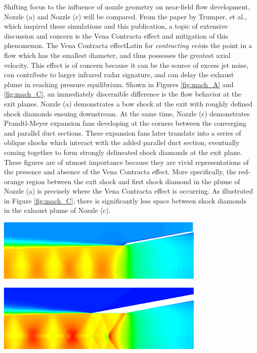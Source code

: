 \documentclass[12pt]{article} %
\begin{document}
Shifting focus to the influence of nozzle geometry on near-field flow development, Nozzle (a) and Nozzle (c) will be compared. From the paper by Trumper, et al., which inspired these simulations and this publication, a topic of extensive discussion and concern is the Vena Contracta effect and mitigation of this phenomenon. The Vena Contracta effect\textemdash Latin for \emph{contracting vein}\textemdash is the point in a flow which has the smallest diameter\cite{mechanics_of_fluids}, and thus possesses the greatest axial velocity. This effect is of concern because it can be the source of excess jet noise, can contribute to larger infrared radar signature, and can delay the exhaust plume in reaching pressure equilibrium.\cite{MilesT.Trumper2018IoNE} Shown in Figures \ref{fig:mach_A} and \ref{fig:mach_C}, an immediately discernible difference is the flow behavior at the exit planes. Nozzle (a) demonstrates a bow shock at the exit with roughly defined shock diamonds ensuing downstream. At the same time, Nozzle (c) demonstrates Prandtl-Meyer expansion fans developing at the corners between the converging and parallel duct sections. These expansion fans later translate into a series of oblique shocks which interact with the added parallel duct section, eventually coming together to form strongly delineated shock diamonds at the exit plane. These figures are of utmost importance because they are vivid representations of the presence and absence of the Vena Contracta effect. More specifically, the red-orange region between the exit shock and first shock diamond in the plume of Nozzle (a) is precisely where the Vena Contracta effect is occurring. As illustrated in Figure \ref{fig:mach_C}, there is significantly less space between shock diamonds in the exhaust plume of Nozzle (c).

\begin{center}
    \includegraphics[width=4in]{Mach_A.png}
    \label{fig:mach_A}
\end{center}

\begin{center}
    \includegraphics[width=4in]{Mach_C_Fine.png}
    \label{fig:mach_C}
\end{center}
\end{document}
